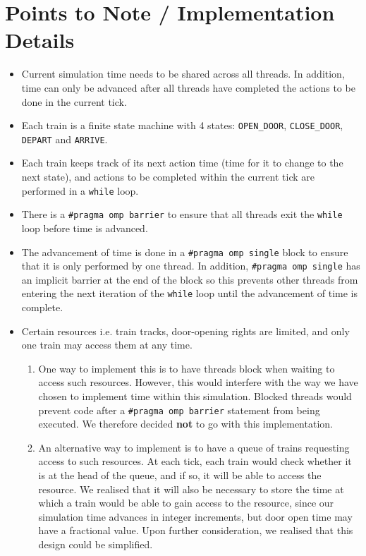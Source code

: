 \documentclass[a4paper,12pt]{article}
\begin{document}
\section{Points to Note / Implementation Details}
\begin{itemize}
	\item Current simulation time needs to be shared across all threads. In addition, time can only be advanced after all threads have completed the actions to be done in the current tick.
	\item Each train is a finite state machine with 4 states: \texttt{OPEN\_DOOR}, \texttt{CLOSE\_DOOR}, \texttt{DEPART} and \texttt{ARRIVE}.
	\item Each train keeps track of its next action time (time for it to change to the next state), and actions to be completed within the current tick are performed in a \texttt{while} loop.
	\item There is a \texttt{#pragma omp barrier} to ensure that all threads exit the \texttt{while} loop before time is advanced.
	\item The advancement of time is done in a \texttt{#pragma omp single} block to ensure that it is only performed by one thread. In addition, \texttt{#pragma omp single} has an implicit barrier at the end of the block so this prevents other threads from entering the next iteration of the \texttt{while} loop until the advancement of time is complete.
	\item Certain resources i.e. train tracks, door-opening rights are limited, and only one train may access them at any time.
	      \begin{enumerate}
		      \item One way to implement this is to have threads block when waiting to access such resources. However, this would interfere with the way we have chosen to implement time within this simulation. Blocked threads would prevent code after a \texttt{#pragma omp barrier} statement from being executed. We therefore decided \textbf{not} to go with this implementation.
		      \item An alternative way to implement is to have a queue of trains requesting access to such resources. At each tick, each train would check whether it is at the head of the queue, and if so, it will be able to access the resource. We realised that it will also be necessary to store the time at which a train would be able to gain access to the resource, since our simulation time advances in integer increments, but door open time may have a fractional value. Upon further consideration, we realised that this design could be simplified.

\end{enumerate}
\end{itemize}
\end{document}
